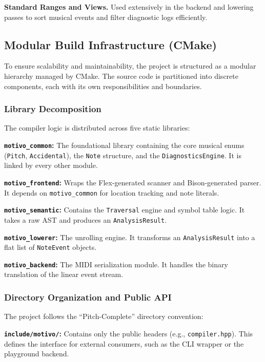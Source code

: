 \noindent \textbf{Standard Ranges and Views.} Used extensively in the backend and lowering passes to sort musical events
and filter diagnostic logs efficiently.

\subsection{Modular Build Infrastructure (CMake)}\label{detail-subsec:modular-build-infrastructure-(cmake)}

To ensure scalability and maintainability, the project is structured as a modular hierarchy managed by CMake.
The source code is partitioned into discrete components, each with its own responsibilities and boundaries.

\subsubsection{Library Decomposition}

The compiler logic is distributed across five static libraries:

\noindent \textbf{\texttt{motivo\_common}:} The foundational library containing the core musical enums (\texttt{Pitch},
\texttt{Accidental}), the \texttt{Note} structure, and the \texttt{DiagnosticsEngine}.
It is linked by every other module.

\noindent \textbf{\texttt{motivo\_frontend}:} Wraps the Flex-generated scanner and Bison-generated parser.
It depends on \texttt{motivo\_common} for location tracking and note literals.

\noindent \textbf{\texttt{motivo\_semantic}:} Contains the \texttt{Traversal} engine and symbol table logic.
It takes a raw AST and produces an \texttt{AnalysisResult}.

\noindent \textbf{\texttt{motivo\_lowerer}:} The unrolling engine.
It transforms an \texttt{AnalysisResult} into a flat list of \texttt{NoteEvent} objects.

\noindent \textbf{\texttt{motivo\_backend}:} The MIDI serialization module.
It handles the binary translation of the linear event stream.

\subsubsection{Directory Organization and Public API}

The project follows the ``Pitch-Complete'' directory convention:

\noindent \textbf{\texttt{include/motivo/}:} Contains only the public headers (e.g., \texttt{compiler.hpp}).
This defines the interface for external consumers, such as the CLI wrapper or the playground backend.

